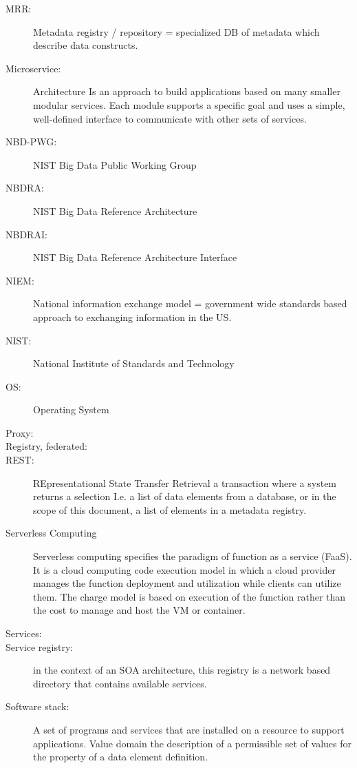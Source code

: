 \begin{description}
\item[MRR:] 	Metadata registry / repository = specialized DB of metadata which describe data constructs.

\item[Microservice:] Architecture	Is an approach to build applications based on many smaller modular services. Each module supports a specific goal and uses a simple, well-defined interface to communicate with other sets of services.

\item[NBD-PWG:]	NIST Big Data Public Working Group

\item[NBDRA:]	NIST Big Data Reference Architecture

\item[NBDRAI:]	NIST Big Data Reference Architecture Interface

\item[NIEM:] 	National information exchange model = government wide standards based approach to exchanging information in the US. 

\item[NIST:]	National Institute of Standards and Technology

\item[OS:]	Operating System


\item[Proxy:]	

\item[Registry, federated:]


\item[REST:]	REpresentational State Transfer
Retrieval 	a transaction where a system returns a selection I.e. a list of data elements from a database, or in the scope of this document, a list of elements in a metadata registry. 

\item[Serverless Computing]	Serverless computing specifies the paradigm of function as a service (FaaS). It is a cloud computing code execution model in which a cloud provider manages the function deployment and utilization while clients can utilize them. The charge model is based on execution of the function rather than the cost to manage and host the VM or container.

\item[Services:] 

\item[Service registry:]	in the context of an SOA architecture, this registry is a network based directory that contains available services. 

\item[Software stack:]	A set of programs and services that are installed on a resource to support applications. 
Value domain	the description of a permissible set of values for the property of a data element definition. 

\end{description}
